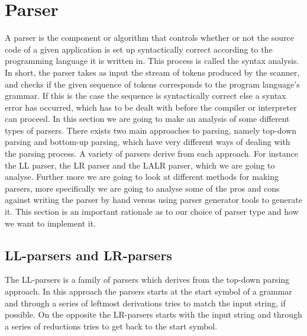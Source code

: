 \section{Parser}
\label{sec:parser}

A parser is the component or algorithm that controls whether or not the source code of a given application is set up syntactically correct according to the programming language it is written in. This process is called the syntax analysis. In short, the parser takes as input the stream of tokens produced by the scanner, and checks if the given sequence of tokens corresponds to the program language's grammar. If this is the case the sequence is syntactically correct else a syntax error has occurred, which has to be dealt with before the compiler or interpreter can proceed. In this section we are going to make an analysis of some different types of parsers. There exists two main approaches to parsing, namely top-down parsing and bottom-up parsing, which have very different ways of dealing with the parsing process. A variety of parsers derive from each approach. For instance the LL parser, the LR parser and the LALR parser, which we are going to analyse. Further more we are going to look at different methods for making parsers, more specifically we are going to analyse some of the pros and cons against writing the parser by hand versus using parser generator tools to generate it. This section is an important rationale as to our choice of parser type and how we want to implement it. 

\subsection{LL-parsers and LR-parsers}

The LL-parsers is a family of parsers which derives from the top-down parsing approach. In this approach the parsers starts at the start symbol of a grammar and through a series of leftmost derivations tries to match the input string, if possible. On the opposite the LR-parsers starts with the input string and through a series of reductions tries to get back to the start symbol.  

